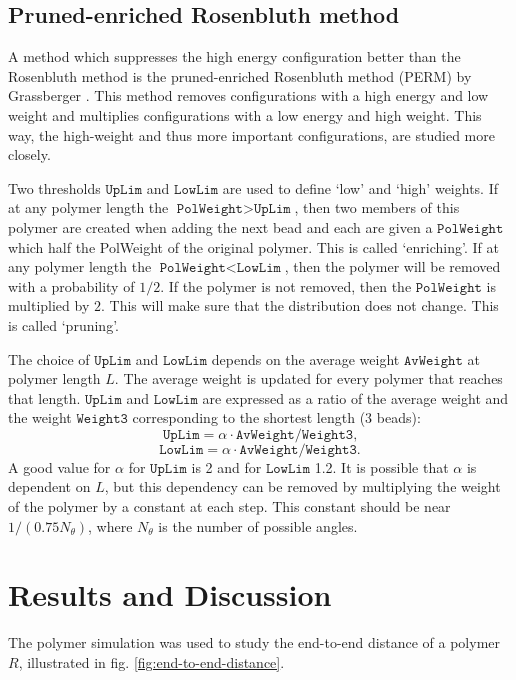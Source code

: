 \documentclass[a4paper,twocolumn]{article}
\def\code#1{\texttt{#1}}
\begin{document}
\subsection{Pruned-enriched Rosenbluth method}
A method which suppresses the high energy configuration better than the Rosenbluth method is the pruned-enriched Rosenbluth method (PERM) by Grassberger \cite{grassberger}. This method removes configurations with a high energy and low weight and multiplies configurations with a low energy and high weight. This way, the high-weight and thus more important configurations, are studied more closely.

Two thresholds $\code{UpLim}$ and $\code{LowLim}$ are used to define `low' and `high' weights. If at any polymer length the $\code{PolWeight} > \code{UpLim}$, then two members of this polymer are created when adding the next bead and each are given a $\code{PolWeight}$ which half the PolWeight of the original polymer. This is called `enriching'. If at any polymer length the $\code{PolWeight} < \code{LowLim}$, then the polymer will be removed with a probability of $1/2$. If the polymer is not removed, then the $\code{PolWeight}$ is multiplied by $2$. This will make sure that the distribution does not change. This is called `pruning'.

The choice of $\code{UpLim}$ and $\code{LowLim}$ depends on the average weight $\code{AvWeight}$ at polymer length $L$.
The average weight is updated for every polymer that reaches that length. $\code{UpLim}$ and $\code{LowLim}$ are expressed as a ratio of the average weight and the weight $\code{Weight3}$ corresponding to the shortest length (3 beads):
\begin{equation}\label{eq:uplim}
    \code{UpLim}=\alpha \cdot \code{AvWeight}/\code{Weight3} \text{,}
\end{equation}
\begin{equation}\label{eq:lowlim}
    \code{LowLim}=\alpha \cdot \code{AvWeight}/\code{Weight3} \text{.}
\end{equation}
A good value for $\alpha$ for $\code{UpLim}$ is 2 and for $\code{LowLim}$ 1.2. It is possible that $\alpha$ is dependent on $L$, but this dependency can be removed by multiplying the weight of the polymer by a constant at each step. This constant should be near $1/(0.75N_{\theta})$, where $N_{\theta}$ is the number of possible angles. 

\section{Results and Discussion}
The polymer simulation was used to study the end-to-end distance of a polymer $R$, illustrated in fig. \ref{fig:end-to-end-distance}.
\end{document}
